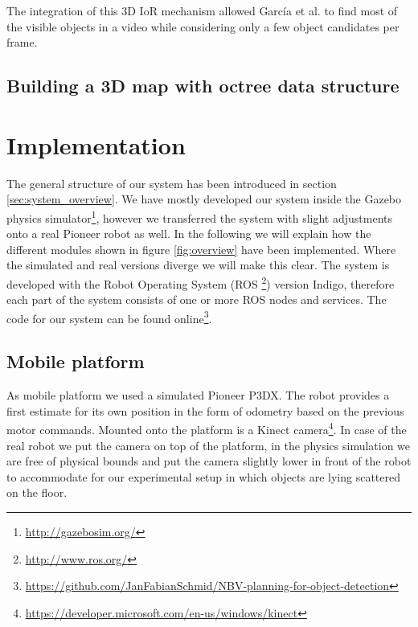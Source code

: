 \documentclass[a4paper,11pt,english]{article}
\begin{document}
The integration of this 3D IoR mechanism allowed García et al. to find most of the visible objects in a video while considering only a few object candidates per frame.

\subsection{Building a 3D map with octree data structure}
\label{Theoretical_background:Building_a_3Dmap_with_octree_data_structure}



\section{Implementation}
\label{Implementation}

The general structure of our system has been introduced in section \ref{sec:system_overview}.
We have mostly developed our system inside the Gazebo physics simulator\footnote{\url{http://gazebosim.org/}}, however we transferred the system with slight adjustments onto a real Pioneer robot as well.
In the following we will explain how the different modules shown in figure \ref{fig:overview} have been implemented.
Where the simulated and real versions diverge we will make this clear.
The system is developed with the Robot Operating System (ROS \footnote{\url{http://www.ros.org/}}) version Indigo, therefore each part of the system consists of one or more ROS nodes and services.
The code for our system can be found online\footnote{\url{https://github.com/JanFabianSchmid/NBV-planning-for-object-detection}}.

\subsection{Mobile platform}
As mobile platform we used a simulated Pioneer P3DX.
The robot provides a first estimate for its own position in the form of odometry based on the previous motor commands.
Mounted onto the platform is a Kinect camera\footnote{\url{https://developer.microsoft.com/en-us/windows/kinect}}.
In case of the real robot we put the camera on top of the platform, in the physics simulation we are free of physical bounds and put the camera slightly lower in front of the robot to accommodate for our experimental setup in which objects are lying scattered on the floor.
\end{document}
